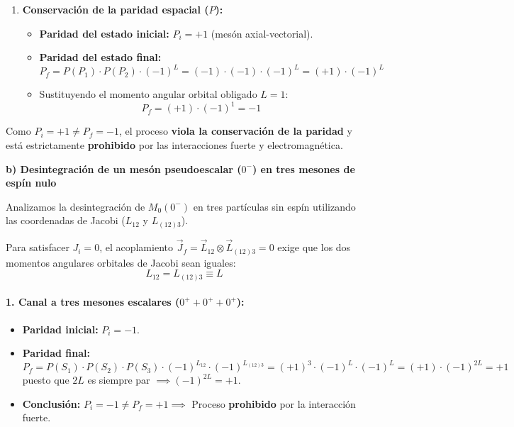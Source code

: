 \begin{problema}
\begin{enumerate}[label=\arabic*.]
    \item \textbf{Conservación de la paridad espacial ($P$):}
    \begin{itemize}
        \item \textbf{Paridad del estado inicial:} $P_i = +1$ (mesón axial-vectorial).
        \item \textbf{Paridad del estado final:}
        \begin{equation*}
            P_f = P(P_1) \cdot P(P_2) \cdot (-1)^L = (-1) \cdot (-1) \cdot (-1)^L = (+1) \cdot (-1)^L
        \end{equation*}
        \item Sustituyendo el momento angular orbital obligado $L = 1$:
        \begin{equation*}
            P_f = (+1) \cdot (-1)^1 = -1
        \end{equation*}
    \end{itemize}
\end{enumerate}

Como $P_i = +1 \neq P_f = -1$, el proceso \textbf{viola la conservación de la paridad} y está estrictamente \textbf{prohibido} por las interacciones fuerte y electromagnética.

\vspace{0.3cm}
\textbf{b) Desintegración de un mesón pseudoescalar ($0^-$) en tres mesones de espín nulo}

Analizamos la desintegración de $M_0 (0^-)$ en tres partículas sin espín utilizando las coordenadas de Jacobi ($L_{12}$ y $L_{(12)3}$).

Para satisfacer $J_i = 0$, el acoplamiento $\vec{J}_f = \vec{L}_{12} \otimes \vec{L}_{(12)3} = 0$ exige que los dos momentos angulares orbitales de Jacobi sean iguales:
\begin{equation*}
    L_{12} = L_{(12)3} \equiv L
\end{equation*}

\paragraph{1. Canal a tres mesones escalares ($0^+ + 0^+ + 0^+$):}
\begin{itemize}
    \item \textbf{Paridad inicial:} $P_i = -1$.
    \item \textbf{Paridad final:}
    \begin{equation*}
        P_f = P(S_1) \cdot P(S_2) \cdot P(S_3) \cdot (-1)^{L_{12}} \cdot (-1)^{L_{(12)3}} = (+1)^3 \cdot (-1)^L \cdot (-1)^L = (+1) \cdot (-1)^{2L} = +1
    \end{equation*}
    puesto que $2L$ es siempre par $\implies (-1)^{2L} = +1$.
    \item \textbf{Conclusión:} $P_i = -1 \neq P_f = +1 \implies$ Proceso \textbf{prohibido} por la interacción fuerte.
\end{itemize}


\end{problema}
